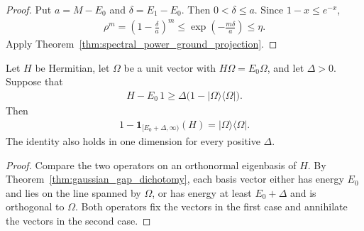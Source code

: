 \begin{proof}
    \leanok
    Put $a=M-E_0$ and $\delta=E_1-E_0$. Then $0<\delta\le a$.
    Since $1-x\le e^{-x}$,
    \begin{align}
        \rho^m=\left(1-\frac\delta a\right)^m
        \le\exp\left(-\frac{m\delta}{a}\right)\le\eta.
    \end{align}
    Apply Theorem~\ref{thm:spectral_power_ground_projection}.
\end{proof}

\begin{theorem}
    \label{thm:global_gap_ground_projection}
    \leanok
    Let $H$ be Hermitian, let $\Omega$ be a unit vector with
    $H\Omega=E_0\Omega$, and let $\Delta>0$. Suppose that
    \begin{align}
        H-E_0\,1\ge\Delta
          \bigl(1-|\Omega\rangle\langle\Omega|\bigr).
    \end{align}
    Then
    \begin{align}
        1-\boldsymbol{1}_{[E_0+\Delta,\infty)}(H)
        =|\Omega\rangle\langle\Omega|.
    \end{align}
    The identity also holds in one dimension for every positive $\Delta$.
\end{theorem}

\begin{proof}
    \leanok
    Compare the two operators on an orthonormal eigenbasis of $H$.
    By Theorem~\ref{thm:gaussian_gap_dichotomy}, each basis vector either
    has energy $E_0$ and lies on the line spanned by $\Omega$, or has
    energy at least $E_0+\Delta$ and is orthogonal to $\Omega$.
    Both operators fix the vectors in the first case and annihilate
    the vectors in the second case.
\end{proof}

